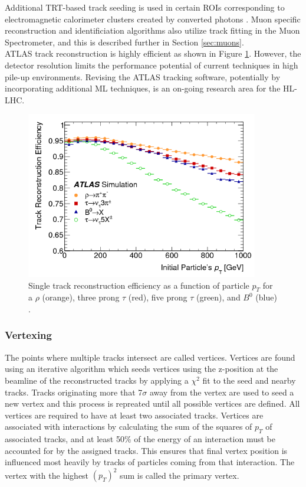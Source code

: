 Additional TRT-based track seeding is used in certain ROIs corresponding to electromagnetic calorimeter clusters created by converted photons \cite{tracking_improvements}. Muon specific reconstruction and identificiation algorithms also utilize track fitting in the Muon Spectrometer, and this is described further in Section \ref{sec:muons}.\\

ATLAS track reconstruction is highly efficient as shown in Figure \ref{fig:track_eff}. However, the detector resolution limits the performance potential of current techniques in high pile-up environments. Revising the ATLAS tracking software, potentially by incorporating additional ML techniques, is an on-going research area for the HL-LHC.

\begin{figure}[h]
    \centering
    \includegraphics[width=4in]{figures/chapter3/track_eff.png}
    \caption{Single track reconstruction efficiency as a function of particle $p_T$ for a $\rho$ (orange), three prong $\tau$ (red), five prong $\tau$ (green), and $B^0$ (blue) \cite{track_run2}.}
    \label{fig:track_eff}
\end{figure}

\subsubsection{Vertexing}
The points where multiple tracks intersect are called vertices. Vertices are found using an iterative algorithm which seeds vertices using the z-position at the beamline of the reconstructed tracks by applying a $\chi^2$ fit to the seed and nearby tracks. Tracks originating more that 7$\sigma$ away from the vertex are used to seed a new vertex and this process is repreated until all possible vertices are defined. All vertices are required to have at least two associated tracks. Vertices are associated with interactions by calculating the sum of the squares of $p_T$ of associated tracks, and at least 50\% of the energy of an interaction must be accounted for by the assigned tracks. This ensures that final vertex position is influenced most heavily by tracks of particles coming from that interaction. The vertex with the highest $(p_T)^2$ sum is called the primary vertex.\cite{vertex}\\ 

